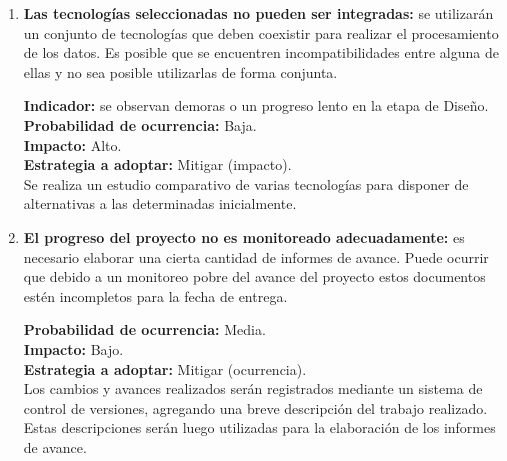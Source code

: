 \begin{enumerate}
\item \textbf{Las tecnologías seleccionadas no pueden ser integradas:} se utilizarán un conjunto de tecnologías que deben coexistir para realizar el procesamiento de los datos. Es posible que se encuentren incompatibilidades entre alguna de ellas y no sea posible utilizarlas de forma conjunta.

\textbf{Indicador:} se observan demoras o un progreso lento en la etapa de Diseño. \\
\textbf{Probabilidad de ocurrencia:} Baja. \\
\textbf{Impacto:} Alto. \\
\textbf{Estrategia a adoptar:} Mitigar (impacto). \\
Se realiza un estudio comparativo de varias tecnologías para disponer de alternativas a las determinadas inicialmente.

\item \textbf{El progreso del proyecto no es monitoreado adecuadamente:} es necesario elaborar una cierta cantidad de informes de avance. Puede ocurrir que debido a un monitoreo pobre del avance del proyecto estos documentos estén incompletos para la fecha de entrega.

\textbf{Probabilidad de ocurrencia:} Media. \\
\textbf{Impacto:} Bajo. \\
\textbf{Estrategia a adoptar:} Mitigar (ocurrencia). \\
Los cambios y avances realizados serán registrados mediante un sistema de control de versiones, agregando una breve descripción del trabajo realizado. Estas descripciones serán luego utilizadas para la elaboración de los informes de avance.

\end{enumerate}

